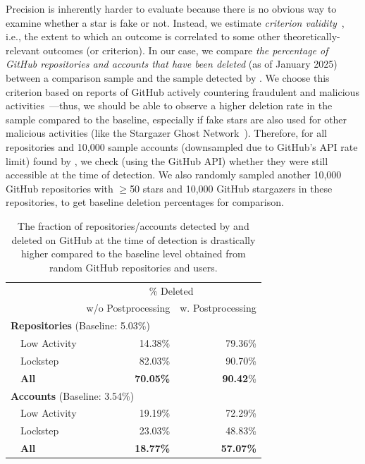 Precision is inherently harder to evaluate because there is no obvious way to examine whether a star is fake or not.
Instead, we estimate \textit{criterion validity}~\cite{cohen1996psychological}, i.e., the extent to which an outcome is correlated to some other theoretically-relevant outcomes (or criterion).
In our case, we compare \emph{the percentage of GitHub repositories and accounts that have been deleted} (as of January 2025) between a comparison sample and the sample detected by \SystemName.
We choose this criterion based on reports of GitHub actively countering fraudulent and malicious activities~\cite{wired-news}---thus, we should be able to observe a higher deletion rate in the \SystemName sample compared to the baseline, especially if fake stars are also used for other malicious activities (like the Stargazer Ghost Network~\cite{stargazer-goblin}).
Therefore, for all repositories and 10,000 sample accounts (downsampled due to GitHub's API rate limit) found by \SystemName, we check (using the GitHub API) whether they were still accessible at the time of detection. %
We also randomly sampled another 10,000 GitHub repositories with $\ge$50 stars and 10,000 GitHub stargazers in these repositories, to get baseline deletion percentages for comparison.

\begin{table}[t]
    \small
    \centering
    \caption{The fraction of repositories/accounts detected by \SystemName and deleted on GitHub at the time of detection is drastically higher compared to the baseline level obtained from random GitHub repositories and users.}
    \label{tab:evaluation}
    \begin{tabular}{lrr}
    \toprule
      & \multicolumn{2}{c}{\% Deleted}\\
    & w/o Postprocessing & w. Postprocessing\\
    \midrule
    \multicolumn{2}{l}{\textbf{Repositories} (Baseline: 5.03\%)} \\
    ~~Low Activity & 14.38\% & 79.36\%\\
    ~~Lockstep & 82.03\% & 90.70\%\\
    ~~\textbf{All} & \textbf{70.05\%} & \textbf{90.42}\%\\
    \multicolumn{2}{l}{\textbf{Accounts} (Baseline: 3.54\%)} \\
    ~~Low Activity & 19.19\% & 72.29\%\\
    ~~Lockstep & 23.03\% & 48.83\% \\
    ~~\textbf{All} & \textbf{18.77\%} & \textbf{57.07\%} \\
    \bottomrule
    \end{tabular}
\end{table}

